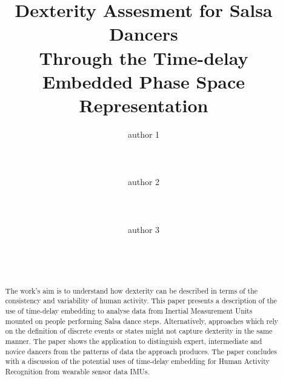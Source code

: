\documentclass{sigchi}
\begin{document}
\title{Dexterity Assesment for Salsa Dancers \\ Through the Time-delay Embedded Phase Space Representation}

\author{
  \alignauthor author 1\\
    \\
    \\
    \\
  \alignauthor author 2\\ %
    \\
    \\
    \\
  \alignauthor author 3\\ %
    \\
    \\
    \\
}

\maketitle

\begin{abstract}
The work's aim is to understand how dexterity can be described in terms of the consistency 
and variability of human activity. 
This paper presents a description of the use of time-delay embedding
to analyse data from Inertial Measurement Units mounted on people performing Salsa dance steps.  
Alternatively, approaches which rely on the definition of 
discrete events or states might not capture dexterity in the same manner. 
The paper shows the application to distinguish expert, intermediate and novice dancers
from the patterns of data the approach produces. 
The paper concludes with a discussion of the potential uses of time-delay embedding for 
Human Activity Recognition from wearable sensor data IMUs.


\end{abstract}



\end{document}
